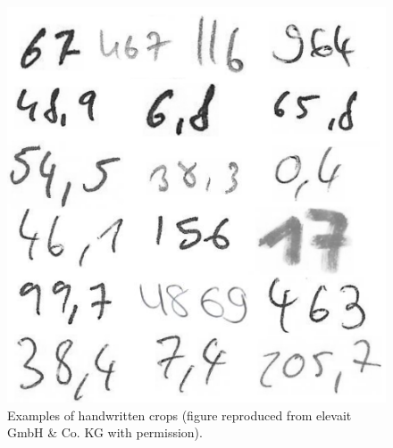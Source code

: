 \begin{figure}[H]
        \begin{center}
		\includegraphics[scale=0.30]{images/Introduction/HandwrittenNumbers.png}
    		\caption[Examples of handwritten crops.]{Examples of handwritten crops (figure reproduced from elevait GmbH \& Co. KG with permission). }
	    	\label{fig:examplesHandwrittenCrops}
	    \end{center}
\end{figure}


